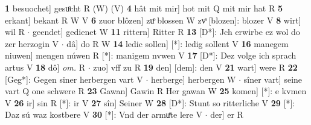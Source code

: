 \documentclass[8pt,a4paper,notitlepage]{article}
\begin{document}
\begin{table}[ht]
\begin{minipage}[t]{0.5\linewidth}
\textbf{1} besuochet] gesuͦcht R (W) (V) \textbf{4} hât mit mir] hot mit Q mit mir hat R \textbf{5} erkant] bekant R W V \textbf{6} zuor blôzen] zuͦ blossen W zvͦ [blozen]: blozer V \textbf{8} wirt] wil R  $\cdot$ geendet] gedienet W \textbf{11} rittern] Ritter R \textbf{13} [D*]: Jch erwirbe ez wol do zer herzogin V  $\cdot$ dâ] do R W \textbf{14} ledic sollen] [*]: ledig sollent V \textbf{16} manegem niuwen] mengen núwen R [*]: manigem nvwen V \textbf{17} [D*]: Dez volge ich sprach artus V \textbf{18} dô] \textit{om.} R  $\cdot$ zuo] vff zu R \textbf{19} den] [dem]: den V \textbf{21} wart] were R \textbf{22} [Geg*]: Gegen siner herbergen vart V  $\cdot$ herberge] herbergen W  $\cdot$ sîner vart] seine vart Q one schwere R \textbf{23} Gawan] Gawin R Her gawan W \textbf{25} komen] [*]: e kvmen V \textbf{26} ir] sin R [*]: ir V \textbf{27} sîn] Seiner W \textbf{28} [D*]: Stunt so ritterliche V \textbf{29} [*]: Daz sú waz kostbere V \textbf{30} [*]: Vnd der armuͤte lere V  $\cdot$ der] er R \newline
\end{minipage}
\end{table}
\end{document}
